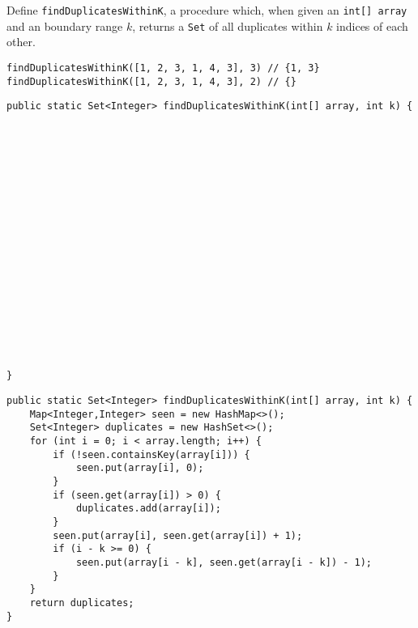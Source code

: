 \begin{blocksection}
\question Define \lstinline$findDuplicatesWithinK$, a procedure which, when
given an \lstinline$int[] array$ and an boundary range $k$, returns a
\lstinline$Set$ of all  duplicates within $k$ indices of each other.

\begin{lstlisting}
findDuplicatesWithinK([1, 2, 3, 1, 4, 3], 3) // {1, 3}
findDuplicatesWithinK([1, 2, 3, 1, 4, 3], 2) // {}
\end{lstlisting}

\ifprintanswers\else
\begin{lstlisting}
public static Set<Integer> findDuplicatesWithinK(int[] array, int k) {



















}
\end{lstlisting}
\fi

\begin{solution}
\begin{lstlisting}
public static Set<Integer> findDuplicatesWithinK(int[] array, int k) {
    Map<Integer,Integer> seen = new HashMap<>();
    Set<Integer> duplicates = new HashSet<>();
    for (int i = 0; i < array.length; i++) {
        if (!seen.containsKey(array[i])) {
            seen.put(array[i], 0);
        }
        if (seen.get(array[i]) > 0) {
            duplicates.add(array[i]);
        }
        seen.put(array[i], seen.get(array[i]) + 1);
        if (i - k >= 0) {
            seen.put(array[i - k], seen.get(array[i - k]) - 1);
        }
    }
    return duplicates;
}
\end{lstlisting}
\end{solution}
\end{blocksection}
